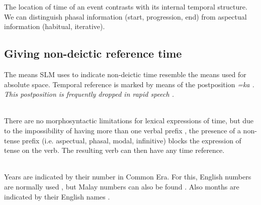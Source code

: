 The location of time of an event contrasts with its internal temporal structure. We can distinguish phasal information (start, progression, end) from aspectual information (habitual, iterative).






\subsection{Giving non-deictic reference time}\label{sec:func:Givingnon-deicticreferencetime}
The means SLM uses to indicate non-deictic time resemble the means used for absolute space. Temporal reference is marked by means of the postposition \em=ka \em {}. This postposition is frequently dropped in rapid speech .


\\

There are no morphosyntactic limitations for lexical expressions of time, but due to the impossibility of having more than one verbal prefix \citep{Slomanson2007cll}, the presence of a non-tense prefix (i.e. aspectual, phasal, modal, infinitive) blocks the expression of tense on the verb. The resulting verb can then have any time reference.



 \\

Years are indicated by their number in Common Era. For this, English numbers are normally used , but Malay numbers can also be found . Also months are indicated by their English names .

 \\


